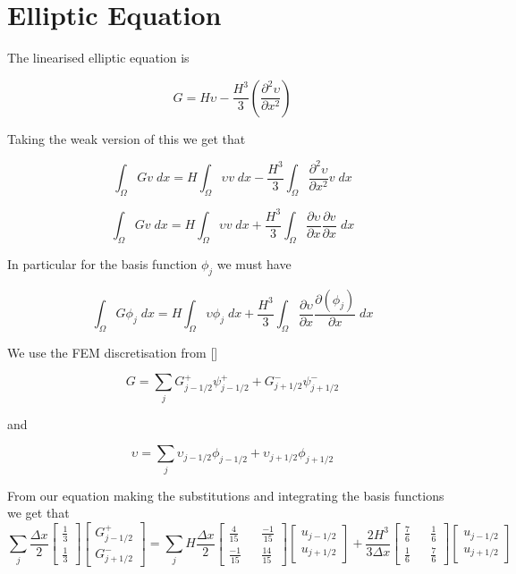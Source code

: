 \documentclass[12pt]{article}
\begin{document}
\section{Elliptic Equation}
The linearised elliptic equation is

\[G = H\upsilon -\frac{H^3}{3} \left(\frac{\partial^2 \upsilon}{\partial x^2}\right)\]

Taking the weak version of this we get that

\[\int_{\Omega}G  v \; dx = H \int_{\Omega} \upsilon v \; dx -\frac{H^3}{3}  \int_{\Omega} \frac{\partial^2 \upsilon}{\partial x^2} v \; dx\]

\[\int_{\Omega}G  v \; dx = H \int_{\Omega} \upsilon v \; dx  + \frac{H^3}{3}  \int_{\Omega} \frac{\partial \upsilon}{\partial x} \frac{\partial v}{\partial x} \; dx\]

In particular for the basis function $\phi_j$ we must have

\[\int_{\Omega}G  \phi_j \; dx = H \int_{\Omega} \upsilon \phi_j \; dx  + \frac{H^3}{3}  \int_{\Omega} \frac{\partial \upsilon}{\partial x} \frac{\partial \left(\phi_j\right)}{\partial x} \; dx\]

We use the FEM discretisation from []

\begin{equation*}
G = \sum_j G^+_{j-1/2}\psi^+_{j-1/2}  + G^-_{j+1/2}\psi^-_{j+1/2}
\end{equation*}

and

\begin{equation}
\upsilon = \sum_j \upsilon_{j-1/2}\phi_{j-1/2} + \upsilon_{j+1/2}\phi_{j+1/2}
\end{equation}

From our equation making the substitutions and integrating the basis functions we get that
\begin{equation}
 \sum _j \frac{\Delta x}{2}\begin{bmatrix} \frac{1}{3}  \\\frac{1}{3}  \end{bmatrix} \begin{bmatrix} G^+_{j-1/2}  \\G^-_{j+1/2} \end{bmatrix} =  \sum_j H \frac{\Delta x}{2} \begin{bmatrix} \frac{4}{15}  && \frac{-1}{15}  \\\frac{-1}{15} && \frac{14}{15}   \end{bmatrix} \begin{bmatrix} u_{j-1/2}  \\u_{j+1/2}   \end{bmatrix}  + \frac{2H^3}{3\Delta x} \begin{bmatrix} \frac{7}{6}  && \frac{1}{6}  \\\frac{1}{6} && \frac{7}{6}   \end{bmatrix}\begin{bmatrix} u_{j-1/2}  \\u_{j+1/2}   \end{bmatrix}
\end{equation}
\end{document}
